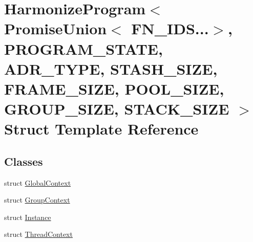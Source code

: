 \hypertarget{structHarmonizeProgram_3_01PromiseUnion_3_01FN__IDS_8_8_8_4_00	PROGRAM__STATE_00	ADR__TYPE_00	ST96305cc1a177b714bc64a5044f46c97c}{\section{Harmonize\-Program$<$ Promise\-Union$<$ F\-N\-\_\-\-I\-D\-S...$>$, P\-R\-O\-G\-R\-A\-M\-\_\-\-S\-T\-A\-T\-E, A\-D\-R\-\_\-\-T\-Y\-P\-E, S\-T\-A\-S\-H\-\_\-\-S\-I\-Z\-E, F\-R\-A\-M\-E\-\_\-\-S\-I\-Z\-E, P\-O\-O\-L\-\_\-\-S\-I\-Z\-E, G\-R\-O\-U\-P\-\_\-\-S\-I\-Z\-E, S\-T\-A\-C\-K\-\_\-\-S\-I\-Z\-E $>$ Struct Template Reference}
\label{structHarmonizeProgram_3_01PromiseUnion_3_01FN__IDS_8_8_8_4_00	PROGRAM__STATE_00	ADR__TYPE_00	ST96305cc1a177b714bc64a5044f46c97c}
}
\subsection*{Classes}
\begin{DoxyCompactItemize}
\item 
struct \hyperlink{structHarmonizeProgram_3_01PromiseUnion_3_01FN__IDS_8_8_8_4_00	PROGRAM__STATE_00	ADR__TYPE_00	ST95fb55d31288aa76301ce5d39247c065}{Global\-Context}
\item 
struct \hyperlink{structHarmonizeProgram_3_01PromiseUnion_3_01FN__IDS_8_8_8_4_00	PROGRAM__STATE_00	ADR__TYPE_00	ST0a79cb977383bd6040caaad90f5c572e}{Group\-Context}
\item 
struct \hyperlink{structHarmonizeProgram_3_01PromiseUnion_3_01FN__IDS_8_8_8_4_00	PROGRAM__STATE_00	ADR__TYPE_00	ST4715b6d9483ec93aa205e44f9547d2b8}{Instance}
\item 
struct \hyperlink{structHarmonizeProgram_3_01PromiseUnion_3_01FN__IDS_8_8_8_4_00	PROGRAM__STATE_00	ADR__TYPE_00	ST8d3ed3d8234af105b6f030f997d25f62}{Thread\-Context}
\end{DoxyCompactItemize}
